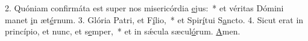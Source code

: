 2. Quóniam confirmáta est super nos misericórdia \uline{e}jus:~* et véritas Dómini manet \uline{i}n æt\uline{é}rnum.
3. Glória Patri, et F\uline{í}lio,~* et Spir\uline{í}tui S\uline{a}ncto.
4. Sicut erat in princípio, et nunc, et s\uline{e}mper,~* et in sǽcula sæcul\uline{ó}rum. \uline{A}men.
